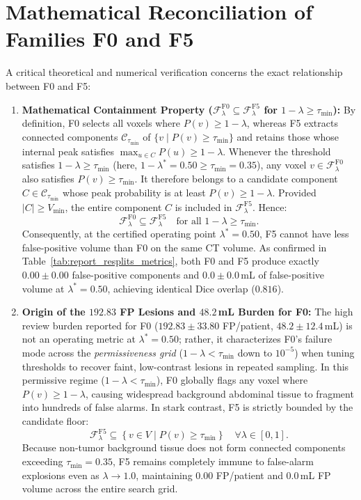 \documentclass[11pt,a4paper]{report}
\begin{document}
\section{Mathematical Reconciliation of Families F0 and F5}
A critical theoretical and numerical verification concerns the exact relationship between F0 and F5:
\begin{enumerate}
    \item \textbf{Mathematical Containment Property ($\mathcal{F}_\lambda^{\mathrm{F0}} \subseteq \mathcal{F}_\lambda^{\mathrm{F5}}$ for $1 - \lambda \ge \tau_{\min}$):}
    By definition, F0 selects all voxels where $P(v) \ge 1 - \lambda$, whereas F5 extracts connected components $\mathcal{C}_{\tau_{\min}}$ of $\{v \mid P(v) \ge \tau_{\min}\}$ and retains those whose internal peak satisfies $\max_{u \in C} P(u) \ge 1 - \lambda$. Whenever the threshold satisfies $1 - \lambda \ge \tau_{\min}$ (here, $1 - \lambda^* = 0.50 \ge \tau_{\min} = 0.35$), any voxel $v \in \mathcal{F}_\lambda^{\mathrm{F0}}$ also satisfies $P(v) \ge \tau_{\min}$. It therefore belongs to a candidate component $C \in \mathcal{C}_{\tau_{\min}}$ whose peak probability is at least $P(v) \ge 1 - \lambda$. Provided $|C| \ge V_{\min}$, the entire component $C$ is included in $\mathcal{F}_\lambda^{\mathrm{F5}}$. Hence:
    \begin{equation}
    \mathcal{F}_\lambda^{\mathrm{F0}} \subseteq \mathcal{F}_\lambda^{\mathrm{F5}} \quad \text{for all } 1 - \lambda \ge \tau_{\min}.
    \end{equation}
    Consequently, at the certified operating point $\lambda^* = 0.50$, F5 cannot have less false-positive volume than F0 on the same CT volume. As confirmed in Table~\ref{tab:report_resplits_metrics}, both F0 and F5 produce exactly $0.00 \pm 0.00$ false-positive components and $0.0 \pm 0.0$\,mL of false-positive volume at $\lambda^* = 0.50$, achieving identical Dice overlap ($0.816$).
    
    \item \textbf{Origin of the $192.83$ FP Lesions and $48.2$\,mL Burden for F0:}
    The high review burden reported for F0 ($192.83 \pm 33.80$ FP/patient, $48.2 \pm 12.4$\,mL) is not an operating metric at $\lambda^* = 0.50$; rather, it characterizes F0's failure mode across the \emph{permissiveness grid} ($1 - \lambda < \tau_{\min}$ down to $10^{-5}$) when tuning thresholds to recover faint, low-contrast lesions in repeated sampling. In this permissive regime ($1 - \lambda < \tau_{\min}$), F0 globally flags any voxel where $P(v) \ge 1 - \lambda$, causing widespread background abdominal tissue to fragment into hundreds of false alarms. In stark contrast, F5 is strictly bounded by the candidate floor:
    \begin{equation}
    \mathcal{F}_\lambda^{\mathrm{F5}} \subseteq \left\{v \in V \mid P(v) \ge \tau_{\min}\right\} \quad \forall \lambda \in [0, 1].
    \end{equation}
    Because non-tumor background tissue does not form connected components exceeding $\tau_{\min} = 0.35$, F5 remains completely immune to false-alarm explosions even as $\lambda \to 1.0$, maintaining $0.00$ FP/patient and $0.0$\,mL FP volume across the entire search grid.


\end{enumerate}
\end{document}
